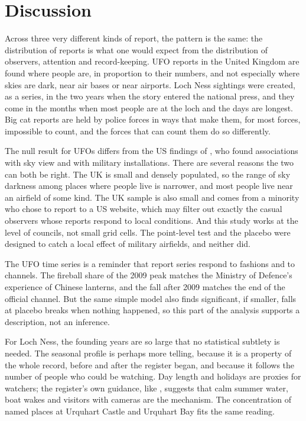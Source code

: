 \documentclass[11pt,a4paper]{article}
\begin{document}
\section{Discussion}\label{sec:disc}
Across three very different kinds of report, the pattern is the same: the distribution of reports is what one would expect from the distribution of observers, attention and record-keeping. UFO reports in the United Kingdom are found where people are, in proportion to their numbers, and not especially where skies are dark, near air bases or near airports. Loch Ness sightings were created, as a series, in the two years when the story entered the national press, and they come in the months when most people are at the loch and the days are longest. Big cat reports are held by police forces in ways that make them, for most forces, impossible to count, and the forces that can count them do so differently.

The null result for UFOs differs from the US findings of \citet{medina2023}, who found associations with sky view and with military installations. There are several reasons the two can both be right. The UK is small and densely populated, so the range of sky darkness among places where people live is narrower, and most people live near an airfield of some kind. The UK sample is also small and comes from a minority who chose to report to a US website, which may filter out exactly the casual observers whose reports respond to local conditions. And this study works at the level of councils, not small grid cells. The point-level test and the placebo were designed to catch a local effect of military airfields, and neither did.

The UFO time series is a reminder that report series respond to fashions and to channels. The fireball share of the 2009 peak matches the Ministry of Defence's experience of Chinese lanterns, and the fall after 2009 matches the end of the official channel. But the same simple model also finds significant, if smaller, falls at placebo breaks when nothing happened, so this part of the analysis supports a description, not an inference.

For Loch Ness, the founding years are so large that no statistical subtlety is needed. The seasonal profile is perhaps more telling, because it is a property of the whole record, before and after the register began, and because it follows the number of people who could be watching. Day length and holidays are proxies for watchers; the register's own guidance, like \citet{shine1988}, suggests that calm summer water, boat wakes and visitors with cameras are the mechanism. The concentration of named places at Urquhart Castle and Urquhart Bay fits the same reading.
\end{document}
